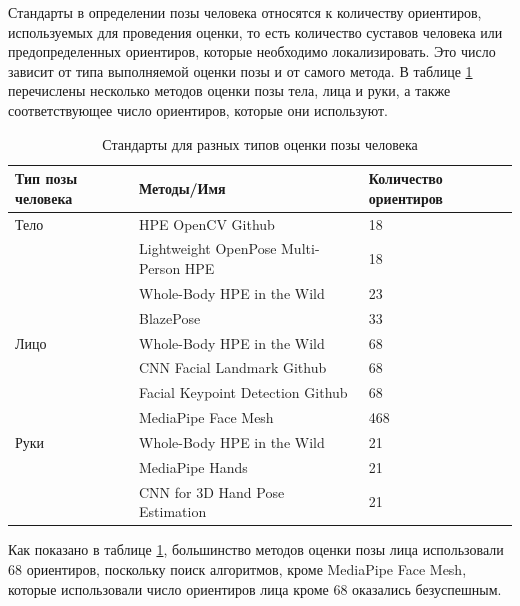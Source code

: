 Стандарты в определении позы человека относятся к количеству ориентиров, используемых для проведения оценки, то есть количество суставов человека или предопределенных ориентиров, которые необходимо локализировать.
Это число зависит от типа выполняемой оценки позы и от самого метода. В таблице \ref{table:standart} перечислены несколько методов оценки позы тела, лица и руки, а также соответствующее число ориентиров, которые они используют.

\begin{table}[ht!]
	\centering
	\caption{Стандарты для разных типов оценки позы человека}
	\label{table:standart}
	\begin{tabular}{|p{3.3cm}|p{9.0cm}|p{2.8cm}|}
		\hline
		\textbf{Тип позы человека} & \textbf{Методы/Имя} & \textbf{Количество ориентиров} \\
		\hline
		Тело  & HPE OpenCV Github \cite{OpenCV-HPE}   &  18 \\
		\cline{2 - 3}  & Lightweight OpenPose Multi-Person HPE \cite{osokin2018lightweight_openpose}    & 18 \\
		\cline{2 - 3}  & Whole-Body HPE in the Wild \cite{jin2020whole}    & 23 \\
		\cline{2 - 3}  & BlazePose \cite{BlazePoese}    & 33 \\
		\hline
		
		Лицо  & Whole-Body HPE in the Wild \cite{jin2020whole}     &  68 \\
		\cline{2 - 3}  & CNN Facial Landmark Github \cite{cnn-facial-landmark}    & 68 \\
		\cline{2 - 3}  & Facial Keypoint Detection Github \cite{Facial-Keypoint-Detection-Udacity-PPB}    & 68 \\
		\cline{2 - 3}  & MediaPipe Face Mesh \cite{mediapipe}    & 468 \\
		\hline
		
		Руки  & Whole-Body HPE in the Wild \cite{jin2020whole}     &  21 \\
		\cline{2 - 3}  & MediaPipe Hands \cite{mediapipe}    & 21 \\
		\cline{2 - 3}  & CNN for 3D Hand Pose Estimation\cite{hierarchiacal}    & 21 \\
		\hline

	\end{tabular}
\end{table}


Как показано в таблице \ref{table:standart}, большинство методов оценки позы лица использовали 68 ориентиров, поскольку поиск алгоритмов, кроме MediaPipe Face Mesh, которые использовали число ориентиров лица кроме 68 оказались безуспешным.

